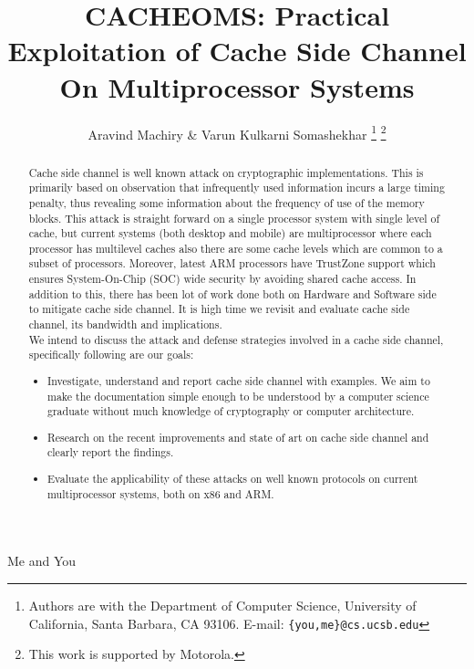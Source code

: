\documentclass[twocolumn]{IEEEtran}
\begin{document}
\title{CACHEOMS: Practical Exploitation of \textbf{Cache} Side Channel \textbf{O}n \textbf{M}ultiprocessor \textbf{S}ystems}


\author{Aravind Machiry \& Varun Kulkarni Somashekhar
\thanks{Authors are with the
Department of Computer Science,
University of California, Santa Barbara, CA 93106.
E-mail: \texttt{\{you,me\}@cs.ucsb.edu}}
\thanks{This work is supported by Motorola.}
}

{Me and You}

\maketitle

\begin{abstract}
Cache side channel is well known attack on cryptographic implementations\cite{bernstein2005cache}\cite{aciccmez2006trace}\cite{banescu2011cache}. This is primarily based on observation that infrequently used information incurs a large timing penalty, thus revealing some information about the frequency of use of the memory blocks. This attack is straight forward on a single processor system with single level of cache, but current systems (both desktop and mobile) are multiprocessor where each processor has multilevel caches also there are some cache levels which are common to a subset of processors. Moreover, latest ARM processors have TrustZone support\cite{frenzel2010arm} which ensures System-On-Chip (SOC) wide security by avoiding shared cache access. In addition to this, there has been lot of work done both on Hardware and Software side to mitigate cache side channel\cite{180212}\cite{wang2007new}. It is high time we revisit and evaluate cache side channel, its bandwidth and implications\cite{184415}.\\
We intend to discuss the attack and defense strategies involved in a cache side channel, specifically following are our goals:
\begin{itemize}
\item Investigate, understand and report cache side channel with examples. We aim to make the documentation simple enough to be understood by a computer science graduate without much knowledge of cryptography or computer architecture.
\item Research on the recent improvements and state of art on cache side channel and clearly report the findings.
\item Evaluate the applicability of these attacks on well known protocols on current multiprocessor systems, both on x86 and ARM.
\end{itemize}
\end{abstract}
\end{document}
